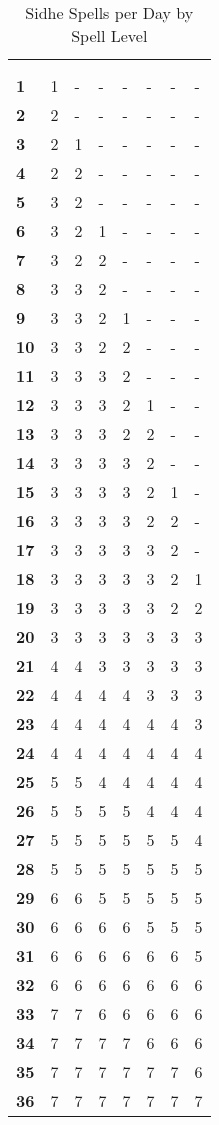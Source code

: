 \begin{multicols*}{2}
\begin {table}[H]
  \caption{Sidhe Spells per Day by Spell Level}
  \begin{tabularx}{\columnwidth}{>{\bfseries}YYYYYYYY}
	\thead{} & \\
	 &  &  &  &  &  &  & \\
	1 & 1 & - & - & - & - & - & -\\
	2 & 2 & - & - & - & - & - & -\\
	3 & 2 & 1 & - & - & - & - & -\\
	4 & 2 & 2 & - & - & - & - & -\\
	5 & 3 & 2 & - & - & - & - & -\\
	6 & 3 & 2 & 1 & - & - & - & -\\
	7 & 3 & 2 & 2 & - & - & - & -\\
	8 & 3 & 3 & 2 & - & - & - & -\\
	9 & 3 & 3 & 2 & 1 & - & - & -\\
	10 & 3 & 3 & 2 & 2 & - & - & -\\
	11 & 3 & 3 & 3 & 2 & - & - & -\\
	12 & 3 & 3 & 3 & 2 & 1 & - & -\\
	13 & 3 & 3 & 3 & 2 & 2 & - & -\\
	14 & 3 & 3 & 3 & 3 & 2 & - & -\\
	15 & 3 & 3 & 3 & 3 & 2 & 1 & -\\
	16 & 3 & 3 & 3 & 3 & 2 & 2 & -\\
	17 & 3 & 3 & 3 & 3 & 3 & 2 & -\\
	18 & 3 & 3 & 3 & 3 & 3 & 2 & 1\\
	19 & 3 & 3 & 3 & 3 & 3 & 2 & 2\\
	20 & 3 & 3 & 3 & 3 & 3 & 3 & 3\\
	21 & 4 & 4 & 3 & 3 & 3 & 3 & 3\\
	22 & 4 & 4 & 4 & 4 & 3 & 3 & 3\\
	23 & 4 & 4 & 4 & 4 & 4 & 4 & 3\\
	24 & 4 & 4 & 4 & 4 & 4 & 4 & 4\\
	25 & 5 & 5 & 4 & 4 & 4 & 4 & 4\\
	26 & 5 & 5 & 5 & 5 & 4 & 4 & 4\\
	27 & 5 & 5 & 5 & 5 & 5 & 5 & 4\\
	28 & 5 & 5 & 5 & 5 & 5 & 5 & 5\\
	29 & 6 & 6 & 5 & 5 & 5 & 5 & 5\\
	30 & 6 & 6 & 6 & 6 & 5 & 5 & 5\\
	31 & 6 & 6 & 6 & 6 & 6 & 6 & 5\\
	32 & 6 & 6 & 6 & 6 & 6 & 6 & 6\\
	33 & 7 & 7 & 6 & 6 & 6 & 6 & 6\\
	34 & 7 & 7 & 7 & 7 & 6 & 6 & 6\\
	35 & 7 & 7 & 7 & 7 & 7 & 7 & 6\\
	36 & 7 & 7 & 7 & 7 & 7 & 7 & 7
  \end {tabularx}
\end {table}


\end{multicols*}
